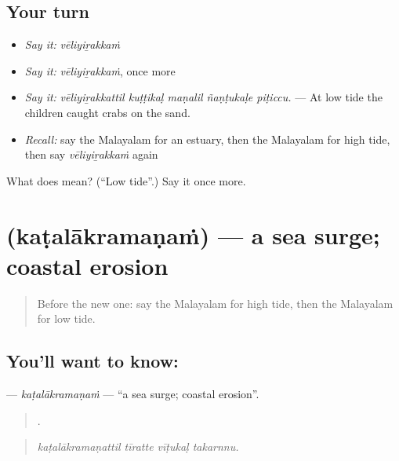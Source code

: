\subsection*{Your turn}
\begin{itemize}
\raggedright
  \item \emph{Say it:} \emph{vēliyiṟakkaṁ}
  \item \emph{Say it:} \emph{vēliyiṟakkaṁ}, once more
  \item \emph{Say it:} \emph{vēliyiṟakkattil kuṭṭikaḷ maṇalil ñaṇṭukaḷe piṭiccu.} — At low tide the children caught crabs on the sand.
  \item \emph{Recall:} say the Malayalam for an estuary, then the Malayalam for high tide, then say \emph{vēliyiṟakkaṁ} again
\end{itemize}

\begin{tcolorbox}[breakable,colback=teal!4,colframe=teal!35!black,title={Before you move on}]
What does  mean? (\textquotedblleft{}Low tide\textquotedblright{}.) Say it once more.
\end{tcolorbox}
\section[\texorpdfstring{\ml{കടലാക്രമണം} (kaṭalākramaṇaṁ)}{കടലാക്രമണം (kaṭalākramaṇaṁ)}]{ (kaṭalākramaṇaṁ) — a sea surge; coastal erosion}

\label{lesson:ML-C497-katalakramanam}



\begin{quote}
Before the new one: say the Malayalam for high tide, then the Malayalam for low tide.
\end{quote}

\subsection*{You'll want to know: }
\textbf{} — \emph{kaṭalākramaṇaṁ} — \textquotedblleft{}a sea surge; coastal erosion\textquotedblright{}.

\begin{quote}
   .
\end{quote}

\begin{quote}
\emph{kaṭalākramaṇattil tīratte vīṭukaḷ takarnnu.}
\end{quote}


